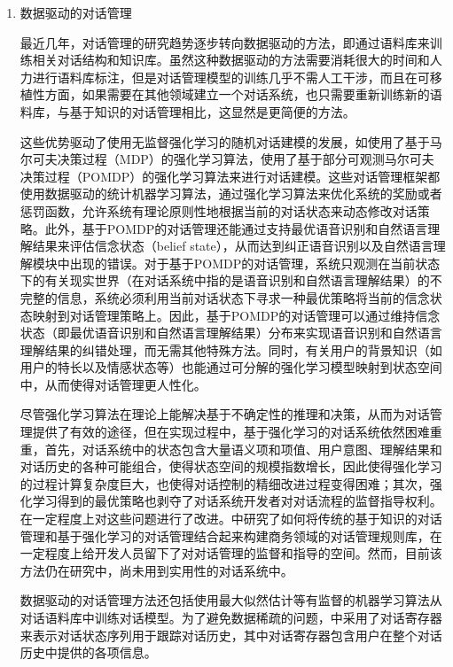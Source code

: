 \begin{enumerate}
\item 数据驱动的对话管理

最近几年，对话管理的研究趋势逐步转向数据驱动的方法，即通过语料库来训练相关对话结构和知识库。虽然这种数据驱动的方法需要消耗很大的时间和人力进行语料库标注，但是对话管理模型的训练几乎不需人工干涉，而且在可移植性方面，如果需要在其他领域建立一个对话系统，也只需要重新训练新的语料库，与基于知识的对话管理相比，这显然是更简便的方法。

这些优势驱动了使用无监督强化学习的随机对话建模的发展，如\cite{Levin2000}使用了基于马尔可夫决策过程（MDP）的强化学习算法，\cite{WilliamsYoung2007, Young2013, Williams2013, Kim2015, Henderson2013}使用了基于部分可观测马尔可夫决策过程（POMDP）的强化学习算法来进行对话建模。这些对话管理框架都使用数据驱动的统计机器学习算法，通过强化学习算法来优化系统的奖励或者惩罚函数，允许系统有理论原则性地根据当前的对话状态来动态修改对话策略。此外，基于POMDP的对话管理还能通过支持最优语音识别和自然语言理解结果来评估信念状态（belief state），从而达到纠正语音识别以及自然语言理解模块中出现的错误。对于基于POMDP的对话管理，系统只观测在当前状态下的有关现实世界（在对话系统中指的是语音识别和自然语言理解结果）的不完整的信息，系统必须利用当前对话状态下寻求一种最优策略将当前的信念状态映射到对话管理策略上。因此，基于POMDP的对话管理可以通过维持信念状态（即最优语音识别和自然语言理解结果）分布来实现语音识别和自然语言理解结果的纠错处理，而无需其他特殊方法。同时，有关用户的背景知识（如用户的特长以及情感状态等）也能通过可分解的强化学习模型映射到状态空间中，从而使得对话管理更人性化。

尽管强化学习算法在理论上能解决基于不确定性的推理和决策，从而为对话管理提供了有效的途径，但在实现过程中，基于强化学习的对话系统依然困难重重\cite{Paek2006}，首先，对话系统中的状态包含大量语义项和项值、用户意图、理解结果和对话历史的各种可能组合，使得状态空间的规模指数增长\cite{Yukai2014}，因此使得强化学习的过程计算复杂度巨大，也使得对话控制的精细改进过程变得困难；其次，强化学习得到的最优策略也剥夺了对话系统开发者对对话流程的监督指导权利。\cite{WilliamsYoung2005, Lemon2006, Young2007, Thomson2008, Williams2008b}在一定程度上对这些问题进行了改进。\cite{Lemon2006, Williams2008b}中研究了如何将传统的基于知识的对话管理和基于强化学习的对话管理结合起来构建商务领域的对话管理规则库，在一定程度上给开发人员留下了对对话管理的监督和指导的空间。然而，目前该方法仍在研究中，尚未用到实用性的对话系统中。

数据驱动的对话管理方法还包括使用最大似然估计等有监督的机器学习算法从对话语料库中训练对话模型\cite{Hurtado2005}。为了避免数据稀疏的问题，\cite{Hurtado2005}中采用了对话寄存器来表示对话状态序列用于跟踪对话历史，其中对话寄存器包含用户在整个对话历史中提供的各项信息。


\end{enumerate}
